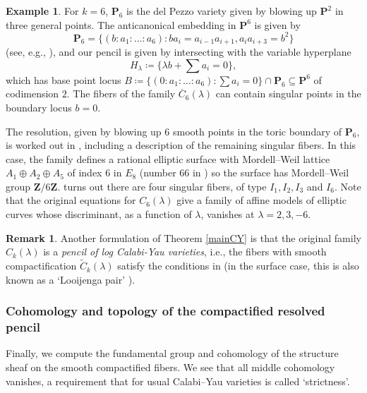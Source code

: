 \documentclass[12pt,reqno]{amsart}
\theoremstyle{definition}
\theoremstyle{plain}
\theoremstyle{definition}
\newtheorem{remark}[theorem]{Remark}
\newtheorem{example}[theorem]{Example}
\newcommand{\Z}{\mathbf{Z}}
\newcommand{\PP}{\mathbf{P}}
\begin{document}
\begin{example} \label{AGex} 
For $k=6$, $\PP_6$ is the del Pezzo variety given by blowing up $\PP^2$ in three general points. The anticanonical embedding in $\PP^6$ is given by 
$$ \PP_6 = \{ (b:a_1:\dots:a_6) \colon ba_i = a_{i-1} a_{i+1}, a_i a_{i+3}=b^2 \} $$
(see, e.g., \cite[Thm.\ 8.4.1]{Dol}), 
and our pencil is given by intersecting with the variable hyperplane $$H_\lambda \coloneqq  \{ \lambda b + \sum a_i = 0 \},$$ 
which has base point locus $B \coloneqq  \{ (0:a_1:\dots:a_6) \colon \sum a_i = 0 \}\cap \PP_6 \subseteq \PP^6$ of codimension $2$. The fibers of the family $\overline C_6(\lambda)$ can contain singular points in the boundary locus $b=0$. 

The resolution, given by blowing up 6 smooth points in the toric boundary of $\PP_6$, is worked out in \cite[\S 5.7]{Grassi}, including a description of the remaining singular fibers. In this case, the family defines a rational elliptic surface with Mordell--Weil lattice $ A_1 \oplus A_2 \oplus A_5$ of index $6$ in $E_8$ (number 66 in \cite[Table 8.2]{SS}) so the surface has Mordell--Weil group $\Z/6\Z$.  turns out there are four singular fibers, of type $I_1,I_2,I_3$ and $I_6$. Note that the original equations for $C_6(\lambda)$ give a family of affine models of elliptic curves whose discriminant, as a function of $\lambda$, vanishes at $\lambda=2,3,-6$. 
\end{example}


\begin{remark} Another formulation of Theorem \ref{mainCY} is that the original family $C_k(\lambda)$ is a \emph{pencil of log Calabi-Yau varieties}, i.e., the fibers with smooth compactification $\widetilde C_k(\lambda)$ satisfy the conditions in \cite{GHK} (in the surface case, this is also known as a `Looijenga pair' \cite{Loo}). 
\end{remark} 

\subsubsection*{Cohomology and topology of the compactified resolved pencil} Finally, we compute the fundamental group and cohomology of the structure sheaf on the smooth compactified fibers. We see that all middle cohomology vanishes, a requirement that for usual Calabi--Yau varieties is called `strictness'. 
\end{document}
